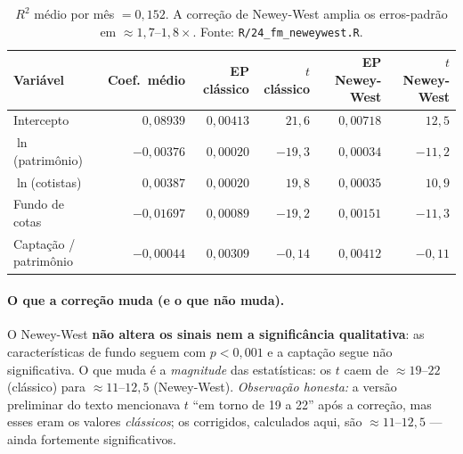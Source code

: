 \documentclass[11pt,a4paper]{article}
\begin{document}
\begin{table}[h]\centering\small
\caption{Cross-section mês a mês (Fama-MacBeth, $T=72$). Erros-padrão clássico vs.\ Newey-West
($L=3$). Coeficientes não-padronizados (por unidade de log).}
\label{tab:nw}
\begin{tabular}{@{}lrrrrr@{}}
\toprule
Variável & Coef.\ médio & EP clássico & $t$ clássico & EP Newey-West & $t$ Newey-West \\
\midrule
Intercepto              & $0{,}08939$  & $0{,}00413$ & $21{,}6$  & $0{,}00718$ & $12{,}5$  \\
$\ln$(patrimônio)       & $-0{,}00376$ & $0{,}00020$ & $-19{,}3$ & $0{,}00034$ & $-11{,}2$ \\
$\ln$(cotistas)         & $0{,}00387$  & $0{,}00020$ & $19{,}8$  & $0{,}00035$ & $10{,}9$  \\
Fundo de cotas          & $-0{,}01697$ & $0{,}00089$ & $-19{,}2$ & $0{,}00151$ & $-11{,}3$ \\
Captação / patrimônio   & $-0{,}00044$ & $0{,}00309$ & $-0{,}14$ & $0{,}00412$ & $-0{,}11$ \\
\bottomrule
\end{tabular}
\caption*{\footnotesize $R^2$ médio por mês $=0{,}152$. A correção de Newey-West amplia os
erros-padrão em $\approx1{,}7$--$1{,}8\times$. Fonte: \texttt{R/24\_fm\_neweywest.R}.}
\end{table}

\paragraph{O que a correção muda (e o que não muda).} O Newey-West \textbf{não altera os sinais
nem a significância qualitativa}: as características de fundo seguem com $p<0{,}001$ e a captação
segue não significativa. O que muda é a \emph{magnitude} das estatísticas: os $t$ caem de
$\approx 19$--$22$ (clássico) para $\approx 11$--$12{,}5$ (Newey-West). \emph{Observação honesta:}
a versão preliminar do texto mencionava $t$ ``em torno de 19 a 22'' após a correção, mas esses
eram os valores \emph{clássicos}; os corrigidos, calculados aqui, são $\approx 11$--$12{,}5$ ---
ainda fortemente significativos.
\end{document}
